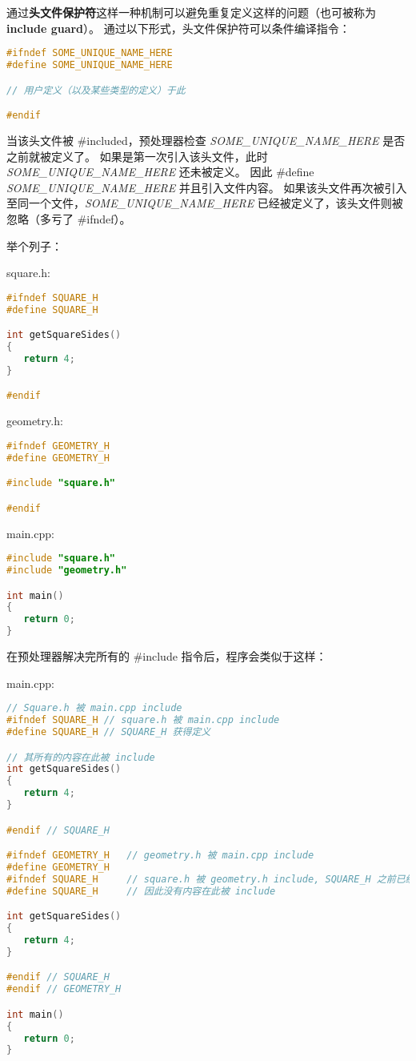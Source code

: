 \documentclass[../../LearnCpp.tex]{subfiles}
\begin{document}

通过\textbf{头文件保护符}这样一种机制可以避免重复定义这样的问题（也可被称为 \textbf{include guard}）。
通过以下形式，头文件保护符可以条件编译指令：

\begin{lstlisting}[language=C++]
#ifndef SOME_UNIQUE_NAME_HERE
#define SOME_UNIQUE_NAME_HERE

// 用户定义（以及某些类型的定义）于此

#endif
\end{lstlisting}

当该头文件被 \#included，预处理器检查 \textit{SOME\_UNIQUE\_NAME\_HERE} 是否之前就被定义了。
如果是第一次引入该头文件，此时 \textit{SOME\_UNIQUE\_NAME\_HERE} 还未被定义。
因此 \#define \textit{SOME\_UNIQUE\_NAME\_HERE} 并且引入文件内容。
如果该头文件再次被引入至同一个文件，\textit{SOME\_UNIQUE\_NAME\_HERE} 已经被定义了，该头文件则被忽略（多亏了 \#ifndef）。

举个列子：

square.h:

\begin{lstlisting}[language=C++]
#ifndef SQUARE_H
#define SQUARE_H

int getSquareSides()
{
   return 4;
}

#endif
\end{lstlisting}

geometry.h:

\begin{lstlisting}[language=C++]
#ifndef GEOMETRY_H
#define GEOMETRY_H

#include "square.h"

#endif
\end{lstlisting}

main.cpp:

\begin{lstlisting}[language=C++]
#include "square.h"
#include "geometry.h"

int main()
{
   return 0;
}
\end{lstlisting}

在预处理器解决完所有的 \#include 指令后，程序会类似于这样：

main.cpp:

\begin{lstlisting}[language=C++]
// Square.h 被 main.cpp include
#ifndef SQUARE_H // square.h 被 main.cpp include
#define SQUARE_H // SQUARE_H 获得定义

// 其所有的内容在此被 include
int getSquareSides()
{
   return 4;
}

#endif // SQUARE_H

#ifndef GEOMETRY_H   // geometry.h 被 main.cpp include
#define GEOMETRY_H
#ifndef SQUARE_H     // square.h 被 geometry.h include, SQUARE_H 之前已经被定义过了
#define SQUARE_H     // 因此没有内容在此被 include

int getSquareSides()
{
   return 4;
}

#endif // SQUARE_H
#endif // GEOMETRY_H

int main()
{
   return 0;
}
\end{lstlisting}
\end{document}
